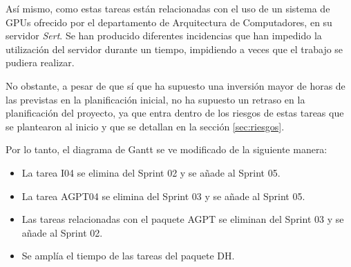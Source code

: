 Así mismo, como estas tareas están relacionadas con el uso de un sistema de GPUs
ofrecido por el departamento de Arquitectura de Computadores, en su servidor \textit{Sert}.
Se han producido diferentes incidencias que han impedido la utilización del servidor durante
un tiempo, impidiendo a veces que el trabajo se pudiera realizar.

No obstante, a pesar de que sí que ha supuesto una inversión mayor de horas de las
previstas en la planificación inicial, no ha supuesto un retraso en la planificación
del proyecto, ya que entra dentro de los riesgos de estas tareas que se plantearon
al inicio y que se detallan en la sección \ref{sec:riesgos}.

Por lo tanto, el diagrama de Gantt se ve modificado de la siguiente manera:

\begin{itemize}
    \item La tarea I04 se elimina del Sprint 02 y se añade al Sprint 05.
    \item La tarea AGPT04 se elimina del Sprint 03 y se añade al Sprint 05.
    \item Las tareas relacionadas con el paquete AGPT se eliminan del Sprint 03 y se añade al Sprint 02.
    \item Se amplía el tiempo de las tareas del paquete DH.
\end{itemize}